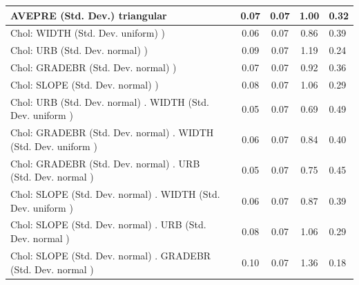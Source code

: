 \begin{table}
\begin{center}
\begin{tabular}{|l|l|c|c|c|l|}
			\hline
			AVEPRE (Std. Dev.) triangular &  & 0.07 & 0.07 & 1.00 & 0.32 \\
			\hline
			 Chol: WIDTH (Std. Dev. uniform) ) &  & 0.06 & 0.07 & 0.86 & 0.39 \\
			\hline
			 Chol: URB (Std. Dev. normal) ) &  & 0.09 & 0.07 & 1.19 & 0.24 \\
			\hline
			 Chol: GRADEBR (Std. Dev. normal) ) &  & 0.07 & 0.07 & 0.92 & 0.36 \\
			\hline
			 Chol: SLOPE (Std. Dev. normal) ) &  & 0.08 & 0.07 & 1.06 & 0.29 \\
			\hline
			 Chol: URB (Std. Dev. normal) . WIDTH (Std. Dev.   uniform ) &  & 0.05 & 0.07 & 0.69 & 0.49 \\
			\hline
			 Chol: GRADEBR (Std. Dev. normal) . WIDTH (Std. Dev.   uniform ) &  & 0.06 & 0.07 & 0.84 & 0.40 \\
			\hline
			 Chol: GRADEBR (Std. Dev. normal) . URB (Std. Dev.   normal ) &  & 0.05 & 0.07 & 0.75 & 0.45 \\
			\hline
			 Chol: SLOPE (Std. Dev. normal) . WIDTH (Std. Dev.   uniform ) &  & 0.06 & 0.07 & 0.87 & 0.39 \\
			\hline
			 Chol: SLOPE (Std. Dev. normal) . URB (Std. Dev.   normal ) &  & 0.08 & 0.07 & 1.06 & 0.29 \\
			\hline
			 Chol: SLOPE (Std. Dev. normal) . GRADEBR (Std. Dev.   normal ) &  & 0.10 & 0.07 & 1.36 & 0.18 \\
			\hline
		\end{tabular}
	\end{center}
\end{table}